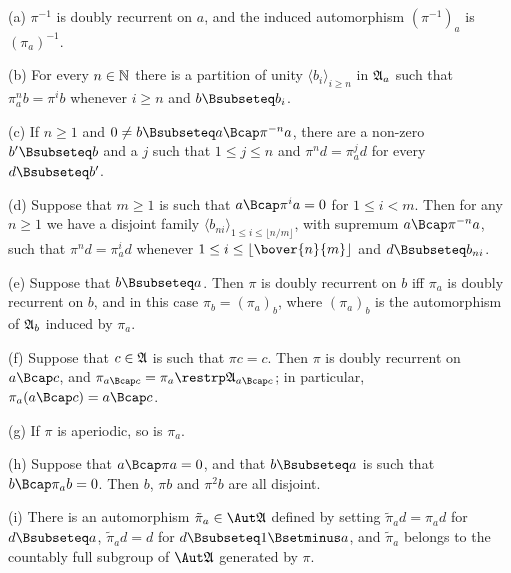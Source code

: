 (a) $\pi^{-1}$ is doubly recurrent on $a$, and the induced automorphism
$(\pi^{-1})_a$ is $(\pi_a)^{-1}$.

(b) For every $n\in\Bbb N$ there is a partition of unity
$\langle b_i\rangle_{i\ge n}$ in $\frak A_a$ such that $\pi_a^nb=\pi^ib$
whenever $i\ge n$ and $b\Bsubseteq b_i$.

(c) If $n\ge 1$ and $0\ne b\Bsubseteq a\Bcap\pi^{-n}a$, there are a
non-zero $b'\Bsubseteq b$ and a $j$ such that $1\le j\le n$ and
$\pi^nd=\pi_a^jd$ for every $d\Bsubseteq b'$.

(d) Suppose that $m\ge 1$ is such that $a\Bcap\pi^ia=0$ for $1\le i<m$.
Then for any $n\ge 1$ we have a disjoint family
$\langle b_{ni}\rangle_{1\le i\le\lfloor n/m\rfloor}$, with supremum
$a\Bcap\pi^{-n}a$, such that $\pi^nd=\pi_a^id$ whenever
$1\le i\le\lfloor\bover{n}{m}\rfloor$ and $d\Bsubseteq b_{ni}$.

(e) Suppose that $b\Bsubseteq a$.   Then $\pi$ is doubly recurrent on
$b$ iff $\pi_a$ is doubly recurrent on $b$, and in this case
$\pi_b=(\pi_a)_b$, where $(\pi_a)_b$ is the automorphism of $\frak A_b$
induced by $\pi_a$.

(f) Suppose that $c\in\frak A$ is such that $\pi c=c$.   Then $\pi$ is
doubly recurrent on $a\Bcap c$, and
$\pi_{a\Bcap c}=\pi_a\restrp\frak A_{a\Bcap c}$;  in particular,
$\pi_a(a\Bcap c)=a\Bcap c$.

(g) If $\pi$ is aperiodic, so is $\pi_a$.

(h) Suppose that $a\Bcap\pi a=0$, and that $b\Bsubseteq a$ is such that
$b\Bcap\pi_ab=0$.   Then $b$, $\pi b$ and $\pi^2b$ are all disjoint.

(i) There is an automorphism $\tilde\pi_a\in\Aut\frak A$ defined by
setting $\tilde\pi_ad=\pi_ad$ for $d\Bsubseteq a$, $\tilde\pi_ad=d$ for
$d\Bsubseteq 1\Bsetminus a$, and $\tilde\pi_a$ belongs to the countably
full subgroup of $\Aut\frak A$ generated by $\pi$.

